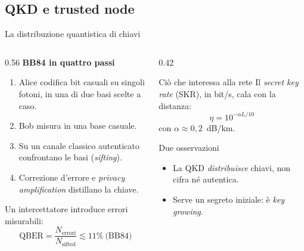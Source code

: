 \documentclass[10pt]{beamer}
\begin{document}
\subsection{QKD e trusted node}

\begin{frame}{La distribuzione quantistica di chiavi}
  \begin{columns}[T]
    \begin{column}{0.56\textwidth}
      \textbf{BB84 in quattro passi}
      \begin{enumerate}
        \item Alice codifica bit casuali su singoli fotoni, in una di due
              basi scelte a caso.
        \item Bob misura in una base casuale.
        \item Su un canale classico \alert{autenticato} confrontano le basi
              (\emph{sifting}).
        \item Correzione d'errore e \emph{privacy amplification}
              distillano la chiave.
      \end{enumerate}
      \vspace{1ex}
      Un intercettatore introduce errori misurabili:
      \[
        \mathrm{QBER} = \frac{N_{\text{errori}}}{N_{\text{sifted}}}
        \lesssim 11\% \ \text{(BB84)}
      \]
    \end{column}
    \begin{column}{0.42\textwidth}
      \begin{block}{Ciò che interessa alla rete}
        Il \emph{secret key rate} (SKR), in bit/s, cala con la distanza:
        \[
          \eta = 10^{-\alpha L/10}
        \]
        con \(\alpha \approx 0{,}2\)~dB/km.
      \end{block}
      \begin{alertblock}{Due osservazioni}
        \begin{itemize}
          \item La QKD \emph{distribuisce} chiavi, non cifra né autentica.
          \item Serve un segreto iniziale: è \emph{key growing}.
        \end{itemize}
      \end{alertblock}
    \end{column}
  \end{columns}
\end{frame}
\end{document}
